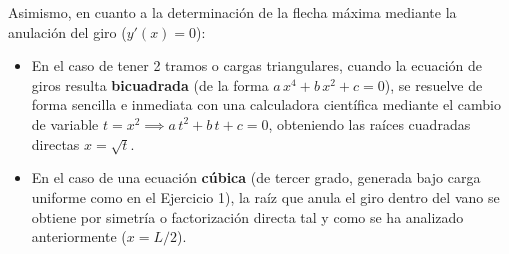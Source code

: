 {\begin{tcolorbox}[colback=yellow!10, colframe=orange!85!black, title=\textbf{Alcance Operativo en Problemas con Múltiples Cortes}]
        Asimismo, en cuanto a la determinación de la flecha máxima mediante la anulación del giro ($y'(x) = 0$):
        \begin{itemize}
            \item En el caso de tener 2 tramos o cargas triangulares, cuando la ecuación de giros resulta \textbf{bicuadrada} (de la forma $a\,x^4 + b\,x^2 + c = 0$), se resuelve de forma sencilla e inmediata con una calculadora científica mediante el cambio de variable $t = x^2 \implies a\,t^2 + b\,t + c = 0$, obteniendo las raíces cuadradas directas $x = \sqrt{t}$.
            \item En el caso de una ecuación \textbf{cúbica} (de tercer grado, generada bajo carga uniforme como en el Ejercicio 1), la raíz que anula el giro dentro del vano se obtiene por simetría o factorización directa tal y como se ha analizado anteriormente ($x = L/2$).
        \end{itemize}
    \end{tcolorbox}
}
